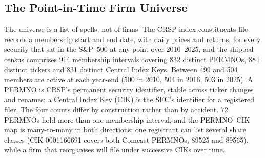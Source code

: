 \subsection{The Point-in-Time Firm Universe}
\label{sec:data-universe}

The universe is a list of spells, not of firms. The CRSP index-constituents file records a membership start and end date, with daily prices and returns, for every security that sat in the S\&P~500 at any point over 2010--2025, and the shipped census comprises 914 membership intervals covering 832 distinct PERMNOs, 884 distinct tickers and 831 distinct Central Index Keys. %
Between 499 and 504 members are active at each year-end (500 in 2010, 504 in 2016, 503 in 2025). %
A PERMNO is CRSP's permanent security identifier, stable across ticker changes and renames; a Central Index Key (CIK) is the SEC's identifier for a registered filer. The four counts differ by construction rather than by accident. 72 PERMNOs hold more than one membership interval, %
and the PERMNO--CIK map is many-to-many in both directions: one registrant can list several share classes (CIK 0001166691 covers both Comcast PERMNOs, 89525 and 89565), while a firm that reorganises will file under successive CIKs over time. %

